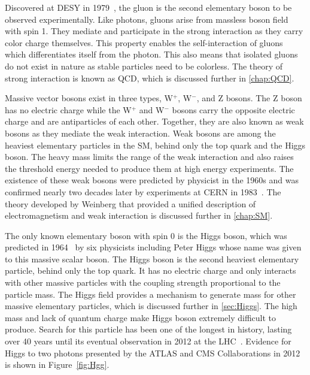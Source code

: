 Discovered at DESY in 1979~\cite{TASSO:1979zyf}, the gluon is the second elementary boson to be observed experimentally. Like photons, gluons arise from massless boson field with spin 1. They mediate and participate in the strong interaction as they carry color charge themselves. This property enables the self-interaction of gluons which differentiates itself from the photon. This also means that isolated gluons do not exist in nature as stable particles need to be colorless. The theory of strong interaction is known as \ac{QCD}, which is discussed further in \autoref{chap:QCD}.

Massive vector bosons exist in three types, W$^{+}$, W$^{-}$, and Z bosons. The Z boson has no electric charge while the W$^{+}$ and W$^{-}$ bosons carry the opposite electric charge and are antiparticles of each other. Together, they are also known as weak bosons as they mediate the weak interaction. Weak bosons are among the heaviest elementary particles in the \ac{SM}, behind only the top quark and the Higgs boson. The heavy mass limits the range of the weak interaction and also raises the threshold energy needed to produce them at high energy experiments. The existence of these weak bosons were predicted by physicist in the 1960s and was confirmed nearly two decades later by experiments at CERN in 1983~\cite{UA1:1983crd,UA2:1983tsx,UA1:1983mne,UA2:1983mlz}. The theory developed by Weinberg that provided a unified description of electromagnetism and weak interaction is discussed further in \autoref{chap:SM}.

The only known elementary boson with spin 0 is the Higgs boson, which was predicted in 1964~\cite{PhysRevLett.13.321,PhysRevLett.13.508,PhysRevLett.13.585} by six physicists including Peter Higgs whose name was given to this massive scalar boson. The Higgs boson is the second heaviest elementary particle, behind only the top quark. It has no electric charge and only interacts with other massive particles with the coupling strength proportional to the particle mass. The Higgs field provides a mechanism to generate mass for other massive elementary particles, which is discussed further in \autoref{sec:Higgs}. The high mass and lack of quantum charge make Higgs boson extremely difficult to produce. Search for this particle has been one of the longest in history, lasting over 40 years until its eventual observation in 2012 at the LHC~\cite{ATLAS:2012yve,CMS:2012qbp}. Evidence for Higgs to two photons presented by the \ac{ATLAS} and \ac{CMS} Collaborations in 2012 is shown in Figure~\ref{fig:Hgg}.

